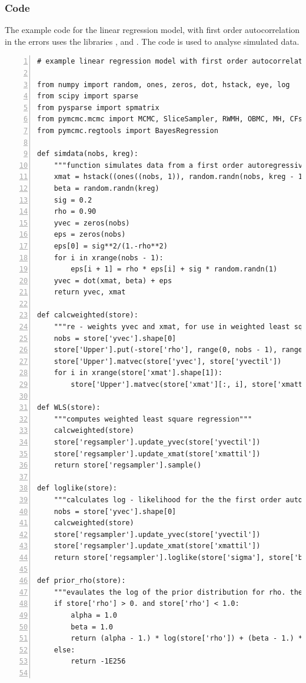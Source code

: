 \documentclass[article]{jss}
\begin{document}
\subsubsection{Code}

The example code for the linear regression model, with first order
autocorrelation in the errors uses the  libraries
,  and . The code is used to analyse
simulated data.


\begin{lstlisting}[basicstyle={\scriptsize},numbers=left,tabsize=4]
# example linear regression model with first order autocorrelation in the errors

from numpy import random, ones, zeros, dot, hstack, eye, log
from scipy import sparse
from pysparse import spmatrix
from pymcmc.mcmc import MCMC, SliceSampler, RWMH, OBMC, MH, CFsampler
from pymcmc.regtools import BayesRegression 

def simdata(nobs, kreg):
    """function simulates data from a first order autoregressive regression"""
    xmat = hstack((ones((nobs, 1)), random.randn(nobs, kreg - 1)))
    beta = random.randn(kreg)
    sig = 0.2
    rho = 0.90
    yvec = zeros(nobs)
    eps = zeros(nobs)
    eps[0] = sig**2/(1.-rho**2)
    for i in xrange(nobs - 1):
        eps[i + 1] = rho * eps[i] + sig * random.randn(1)
    yvec = dot(xmat, beta) + eps
    return yvec, xmat

def calcweighted(store):
    """re - weights yvec and xmat, for use in weighted least squares regression"""
    nobs = store['yvec'].shape[0]
    store['Upper'].put(-store['rho'], range(0, nobs - 1), range(1, nobs))
    store['Upper'].matvec(store['yvec'], store['yvectil'])
    for i in xrange(store['xmat'].shape[1]):
        store['Upper'].matvec(store['xmat'][:, i], store['xmattil'][:, i])

def WLS(store):
    """computes weighted least square regression"""
    calcweighted(store)
    store['regsampler'].update_yvec(store['yvectil'])
    store['regsampler'].update_xmat(store['xmattil'])
    return store['regsampler'].sample()

def loglike(store):
    """calculates log - likelihood for the the first order autoregressive regression model"""
    nobs = store['yvec'].shape[0]
    calcweighted(store)
    store['regsampler'].update_yvec(store['yvectil'])
    store['regsampler'].update_xmat(store['xmattil'])
    return store['regsampler'].loglike(store['sigma'], store['beta'])

def prior_rho(store):
    """evaulates the log of the prior distribution for rho. the beta distribution is used"""
    if store['rho'] > 0. and store['rho'] < 1.0:
        alpha = 1.0
        beta = 1.0
        return (alpha - 1.) * log(store['rho']) + (beta - 1.) * log(1.-store['rho'])
    else:
        return -1E256


\end{lstlisting}
\end{document}
